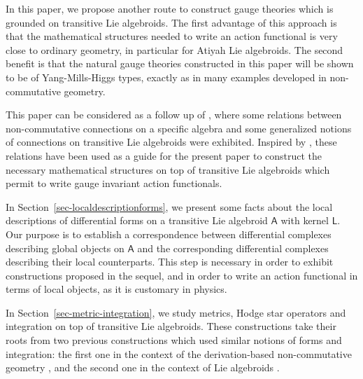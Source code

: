 \documentclass[number]{elsarticle}
\theoremstyle{definition}
\theoremstyle{remark}
\numberwithin{equation}{section}
\begin{document}
In this paper, we propose another route to construct gauge theories which is grounded on transitive Lie algebroids. The first advantage of this approach is that the mathematical structures needed to write an action functional is very close to ordinary geometry, in particular for Atiyah Lie algebroids. The second benefit is that the natural gauge theories constructed in this paper will be shown to be of Yang-Mills-Higgs types, exactly as in many examples developed in non-commutative geometry.

This paper can be considered as a follow up of \cite{Mass38}, where some relations between non-commutative connections on a specific algebra and some generalized notions of connections on transitive Lie algebroids were exhibited. Inspired by \cite{Mass15}, these relations have been used as a guide for the present paper to construct the necessary mathematical structures on top of transitive Lie algebroids which permit to write gauge invariant action functionals. 

In Section~\ref{sec-localdescriptionforms}, we present some facts about the local descriptions of differential forms on a transitive Lie algebroid ${{{{\mathbf{\mathsf{{A}}}}}}}$ with kernel ${{{{\mathbf{\mathsf{{L}}}}}}}$. Our purpose is to establish a correspondence between differential complexes describing global objects on ${{{{\mathbf{\mathsf{{A}}}}}}}$ and the corresponding differential complexes describing their local counterparts. This step is necessary in order to exhibit constructions proposed in the sequel, and in order to write an action functional in terms of local objects, as it is customary in physics.

In Section~\ref{sec-metric-integration}, we study metrics, Hodge star operators and integration on top of transitive Lie algebroids. These constructions take their roots from two previous constructions which used similar notions of forms and integration: the first one in the context of the derivation-based non-commutative geometry \cite{Mass15}, and the second one in the context of Lie algebroids \cite{Kuba96a,MR1908998,MR2020382}.
\end{document}
